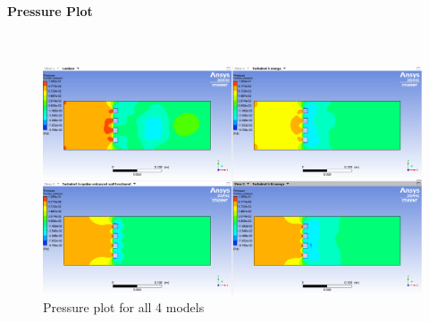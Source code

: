 \paragraph{Pressure Plot}~

\begin{figure}[htbp]   
    \centering
    \includegraphics[width=1\textwidth]{img/Pressure_plot_comparison.png}
    \caption{Pressure plot for all 4 models}
    \label{fig:press_plot}
\end{figure}

